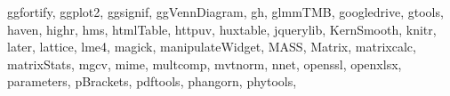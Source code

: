 \documentclass[
]{book}
\newenvironment{Shaded}{\begin{snugshade}}{\end{snugshade}}
\newcommand{\NormalTok}[1]{#1}
\newcommand{\StringTok}[1]{\textcolor[rgb]{0.31,0.60,0.02}{#1}}
\begin{document}
\begin{Shaded}
\begin{Highlighting}[]
  \StringTok{\textquotesingle{}ggfortify\textquotesingle{}}\NormalTok{, }\StringTok{\textquotesingle{}ggplot2\textquotesingle{}}\NormalTok{, }\StringTok{\textquotesingle{}ggsignif\textquotesingle{}}\NormalTok{, }\StringTok{\textquotesingle{}ggVennDiagram\textquotesingle{}}\NormalTok{, }\StringTok{\textquotesingle{}gh\textquotesingle{}}\NormalTok{, }\StringTok{\textquotesingle{}glmmTMB\textquotesingle{}}\NormalTok{, }\StringTok{\textquotesingle{}googledrive\textquotesingle{}}\NormalTok{,}
  \StringTok{\textquotesingle{}gtools\textquotesingle{}}\NormalTok{, }\StringTok{\textquotesingle{}haven\textquotesingle{}}\NormalTok{, }\StringTok{\textquotesingle{}highr\textquotesingle{}}\NormalTok{, }\StringTok{\textquotesingle{}hms\textquotesingle{}}\NormalTok{, }\StringTok{\textquotesingle{}htmlTable\textquotesingle{}}\NormalTok{, }\StringTok{\textquotesingle{}httpuv\textquotesingle{}}\NormalTok{, }\StringTok{\textquotesingle{}huxtable\textquotesingle{}}\NormalTok{, }\StringTok{\textquotesingle{}jquerylib\textquotesingle{}}\NormalTok{,}
  \StringTok{\textquotesingle{}KernSmooth\textquotesingle{}}\NormalTok{, }\StringTok{\textquotesingle{}knitr\textquotesingle{}}\NormalTok{, }\StringTok{\textquotesingle{}later\textquotesingle{}}\NormalTok{, }\StringTok{\textquotesingle{}lattice\textquotesingle{}}\NormalTok{, }\StringTok{\textquotesingle{}lme4\textquotesingle{}}\NormalTok{, }\StringTok{\textquotesingle{}magick\textquotesingle{}}\NormalTok{, }\StringTok{\textquotesingle{}manipulateWidget\textquotesingle{}}\NormalTok{, }\StringTok{\textquotesingle{}MASS\textquotesingle{}}\NormalTok{,}
  \StringTok{\textquotesingle{}Matrix\textquotesingle{}}\NormalTok{, }\StringTok{\textquotesingle{}matrixcalc\textquotesingle{}}\NormalTok{, }\StringTok{\textquotesingle{}matrixStats\textquotesingle{}}\NormalTok{, }\StringTok{\textquotesingle{}mgcv\textquotesingle{}}\NormalTok{, }\StringTok{\textquotesingle{}mime\textquotesingle{}}\NormalTok{, }\StringTok{\textquotesingle{}multcomp\textquotesingle{}}\NormalTok{, }\StringTok{\textquotesingle{}mvtnorm\textquotesingle{}}\NormalTok{, }\StringTok{\textquotesingle{}nnet\textquotesingle{}}\NormalTok{,}
  \StringTok{\textquotesingle{}openssl\textquotesingle{}}\NormalTok{, }\StringTok{\textquotesingle{}openxlsx\textquotesingle{}}\NormalTok{, }\StringTok{\textquotesingle{}parameters\textquotesingle{}}\NormalTok{, }\StringTok{\textquotesingle{}pBrackets\textquotesingle{}}\NormalTok{, }\StringTok{\textquotesingle{}pdftools\textquotesingle{}}\NormalTok{, }\StringTok{\textquotesingle{}phangorn\textquotesingle{}}\NormalTok{, }\StringTok{\textquotesingle{}phytools\textquotesingle{}}\NormalTok{,}

\end{Highlighting}
\end{Shaded}
\end{document}
